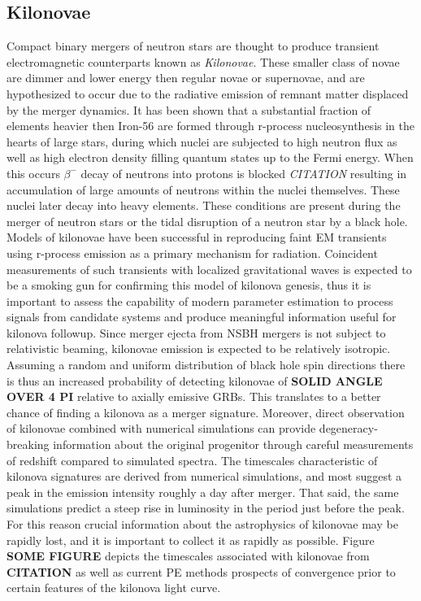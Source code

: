 \subsection{Kilonovae}
Compact binary mergers of neutron stars are thought to produce transient electromagnetic counterparts known as \textit{Kilonovae}. These smaller class of novae are dimmer and lower energy then regular novae or supernovae, and are hypothesized to occur due to the radiative emission of remnant matter displaced by the merger dynamics. It has been shown that a substantial fraction of elements heavier then Iron-56 are formed through r-process nucleosynthesis in the hearts of large stars, during which nuclei are subjected to high neutron flux as well as high electron density filling quantum states up to the Fermi energy. When this occurs $\beta^-$ decay of neutrons into protons is blocked \textit{CITATION} resulting in accumulation of large amounts of neutrons within the nuclei themselves. These nuclei later decay into heavy elements. These conditions are present during the merger of neutron stars or the tidal disruption of a neutron star by a black hole. Models of kilonovae have been successful in reproducing faint EM transients using r-process emission as a primary mechanism for radiation. Coincident measurements of such transients with localized gravitational waves is expected to be a smoking gun for confirming this model of kilonova genesis, thus it is important to assess the capability of modern parameter estimation to process signals from candidate systems and produce meaningful information useful for kilonova followup. 
Since merger ejecta from NSBH mergers is not subject to relativistic beaming, kilonovae emission is expected to be relatively isotropic. Assuming a random and uniform distribution of black hole spin directions there is thus an increased probability of detecting kilonovae of \textbf{SOLID ANGLE OVER 4 PI} relative to axially emissive GRBs. This translates to a better chance of finding a kilonova as a merger signature. Moreover, direct observation of kilonovae combined with numerical simulations can provide degeneracy-breaking information about the original progenitor through careful measurements of redshift compared to simulated spectra.   
The timescales characteristic of kilonova signatures are derived from numerical simulations, and most suggest a peak in the emission intensity roughly a day after merger. That said, the same simulations predict a steep rise in luminosity in the period just before the peak. For this reason crucial information about the astrophysics of kilonovae may be rapidly lost, and it is important to collect it as rapidly as possible. Figure \textbf{SOME FIGURE} depicts the timescales associated with kilonovae from \textbf{CITATION} as well as current PE methods prospects of convergence prior to certain features of the kilonova light curve.

